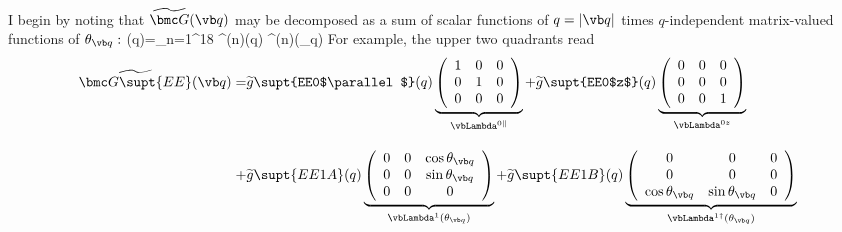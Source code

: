 \documentclass[letterpaper]{article}
\renewcommand{\wt}{\widetilde}
\begin{document}
I begin by noting that $\wt{\bmc G}(\vb q)$ may be decomposed as a sum
of scalar functions of $q=|\vb q|$ times $q$-independent
matrix-valued functions of $\theta_{\vb q}:$
{
\wt{\bmc G}(\vb q)=\sum_{n=1}^{18}
   \wt{g}^{(n)}(q) \vbLambda^{(n)}(\theta_{\vb q})
}
For example, the upper two quadrants read
\begin{align*}
 \wt{\bmc G\supt{EE}}(\vb q)
 = &\wt{g}\supt{EE0$\parallel$}(q)
    \underbrace{ \left(\begin{array}{ccc}
                       1 & 0 & 0 \\ 
                       0 & 1 & 0 \\ 
                       0 & 0 & 0 \\ 
                 \end{array}\right)
               }_{\vbLambda^{0\parallel}}
  + \wt{g}\supt{EE0$z$}(q)
    \underbrace{ \left(\begin{array}{ccc}
                       0 & 0 & 0 \\ 
                       0 & 0 & 0 \\ 
                       0 & 0 & 1 \\ 
                 \end{array}\right)
               }_{\vbLambda^{0z}}
\\[10pt]
 + &\wt{g}\supt{EE1A}(q)
    \underbrace{ \left(\begin{array}{ccc}
                       0 & 0 & \cos\theta_{\vb q} \\ 
                       0 & 0 & \sin\theta_{\vb q} \\ 
                       0 & 0 & 0
                 \end{array}\right)
               }_{\vbLambda^{1}(\theta_{\vb q})}
 +  \wt{g}\supt{EE1B}(q)
    \underbrace{ \left(\begin{array}{ccc}
                       0 & 0 & 0 \\
                       0 & 0 & 0 \\
                       \cos\theta_{\vb q} & \sin\theta_{\vb q} & 0
                 \end{array}\right)
               }_{\vbLambda^{1\dagger}(\theta_{\vb q})}
\\[10pt]

\end{align*}
\end{document}
